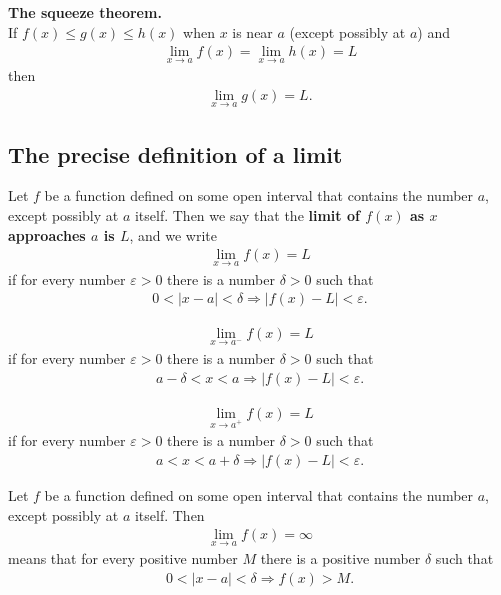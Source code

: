 \documentclass{article}
\begin{document}
\begin{theorem}
    \textbf{The squeeze theorem.}\\
    If $f(x)\leq g(x)\leq h(x)$ when $x$ is near $a$ (except possibly at $a$) and
    \begin{align*}
        \lim_{x\to a}f(x) = \lim_{x\to a}h(x) = L
    \end{align*}
    then
    \begin{align*}
        \lim_{x \to a}g(x) = L.
    \end{align*}
\end{theorem}
\subsection{The precise definition of a limit}
\begin{definition}
    Let $f$ be a function defined on some open interval that contains the number $a$, except possibly at $a$ itself. Then we say that the \textbf{limit of $f(x)$ as $x$ approaches $a$ is $L$}, and we write
    \begin{align*}
        \lim_{x\to a}f(x) = L
    \end{align*}
    if for every number $\varepsilon>0$ there is a number $\delta>0$ such that
    \begin{align*}
        0<|x-a|<\delta \Rightarrow |f(x)-L|<\varepsilon.
    \end{align*}
\end{definition}
\begin{definition}
    \begin{align*}
        \lim_{x\to a^-}f(x) = L
    \end{align*}
    if for every number $\varepsilon > 0$ there is a number $\delta > 0$ such that
    \begin{align*}
        a-\delta < x < a \Rightarrow |f(x)-L| < \varepsilon.
    \end{align*}
\end{definition}
\begin{align*}
    \lim_{x\to a^+}f(x) = L
\end{align*}
    if for every number $\varepsilon > 0$ there is a number $\delta > 0$ such that
\begin{align*}
    a < x < a+\delta \Rightarrow |f(x)-L| < \varepsilon.
\end{align*}
\begin{definition}
    Let $f$ be a function defined on some open interval that contains the number $a$, except possibly at $a$ itself. Then
    \begin{align*}
        \lim_{x\to a}f(x) = \infty
    \end{align*}
    means that for every positive number $M$ there is a positive number $\delta$ such that
    \begin{align*}
        0<|x-a|<\delta \Rightarrow f(x)>M.
    \end{align*}
\end{definition}
\end{document}

